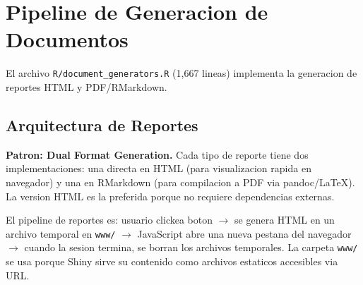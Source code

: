\documentclass[11pt, letterpaper, twoside]{report}
\begin{document}
\begin{center}
\end{center}


\chapter{Pipeline de Generacion de Documentos}
\label{ch:docgen}

El archivo \texttt{R/document\_generators.R} (1,667 lineas) implementa la generacion
de reportes HTML y PDF/RMarkdown.

\section{Arquitectura de Reportes}
\label{sec:reportes}

\begin{patronbox}
\textbf{Patron: Dual Format Generation.} Cada tipo de reporte tiene dos
implementaciones: una directa en HTML (para visualizacion rapida en navegador)
y una en RMarkdown (para compilacion a PDF via pandoc/LaTeX). La version HTML es
la preferida porque no requiere dependencias externas.
\end{patronbox}

\begin{intuicionbox}
El pipeline de reportes es: usuario clickea boton $\to$ se genera HTML en un
archivo temporal en \texttt{www/} $\to$ JavaScript abre una nueva pestana del
navegador $\to$ cuando la sesion termina, se borran los archivos temporales.
La carpeta \texttt{www/} se usa porque Shiny sirve su contenido como archivos
estaticos accesibles via URL.
\end{intuicionbox}
\end{document}
